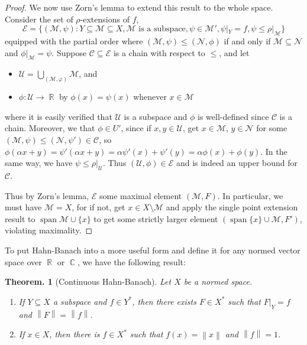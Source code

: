\documentclass[11pt, a4paper]{memoir}
\DeclareMathOperator{\R}{{\mathbb{R}}}
\DeclareMathOperator{\C}{{\mathbb{C}}}
\newcommand{\norm}[1]{\ensuremath{\left\lVert#1\right\rVert}}
\theoremstyle{change}
\newtheorem{theorem}{Theorem.}[section]
\theoremstyle{plain}
\theoremstyle{nonumberplain}
\newtheorem{proof}{Proof}
\DeclareMathOperator{\spn}{span}
\numberwithin{equation}{section}
\begin{document}
\begin{proof}
    We now use Zorn's lemma to extend this result to the whole space.
    Consider the set of $\rho$-extensions of $f$,
    \begin{equation*}
        \mathcal{E} = \bigl\{(\mathcal{M},\psi) : Y\subseteq\mathcal{M}\subseteq X,\mathcal{M}\text{ is a subspace}, \psi\in\mathcal{M}',\psi|_Y=f,\psi\leq \rho|_{\mathcal{M}}\bigr\}
    \end{equation*}
    equipped with the partial order where $(\mathcal{M},\psi)\leq(\mathcal{N},\phi)$ if and only if $\mathcal{M}\subseteq\mathcal{N}$ and $\phi|_{\mathcal{M}}=\psi$.
    Suppose $\mathcal{C}\subseteq\mathcal{E}$ is a chain with respect to $\leq$, and let
    \begin{itemize}[nl]
        \item $\mathcal{U}=\bigcup_{(\mathcal{M},\varphi)}\mathcal{M}$, and
        \item $\phi:\mathcal{U}\to\R$ by $\phi(x)=\psi(x)$ whenever $x\in\mathcal{M}$
    \end{itemize}
    where it is easily verified that $\mathcal{U}$ is a subspace and $\phi$ is well-defined since $\mathcal{C}$ is a chain.
    Moreover, we that $\phi\in U'$, since if $x,y\in\mathcal{U}$, get $x\in\mathcal{M}$, $y\in\mathcal{N}$ for some $(\mathcal{M},\psi)\leq(\mathcal{N},\psi')\in\mathcal{C}$, so $\phi(\alpha x+y)=\psi'(\alpha x+y)=\alpha\psi'(x)+\psi'(y)=\alpha\phi(x)+\phi(y)$.
    In the same way, we have $\psi\leq\rho|_{\mathcal{U}}$.
    Thus $(\mathcal{U},\phi)\in\mathcal{E}$ and is indeed an upper bound for $\mathcal{C}$.

    Thus by Zorn's lemma, $\mathcal{E}$ some maximal element $(\mathcal{M},F)$.
    In particular, we must have $\mathcal{M}=X$, for if not, get $x\in X\setminus\mathcal{M}$ and apply the single point extension result to $\spn\mathcal{M}\cup\{x\}$ to get some strictly larger element $(\spn\{x\}\cup \mathcal{M},F')$, violating maximality.
\end{proof}
To put Hahn-Banach into a more useful form and define it for any normed vector space over $\R$ or $\C$, we have the following result:
\begin{theorem}[Continuous Hahn-Banach]\label{c:hahn-ext}
    Let $X$ be a normed space.
    \begin{enumerate}[nl,r]
        \item If $Y\subseteq X$ a subspace and $f\in Y^*$, then there exists $F\in X^*$ such that $F|_{Y}=f$ and $\norm{F}=\norm{f}$.
        \item If $x\in X$, then there is $f\in X^*$ such that $f(x)=\norm{x}$ and $\norm{f}=1$.
    \end{enumerate}
\end{theorem}
\end{document}

